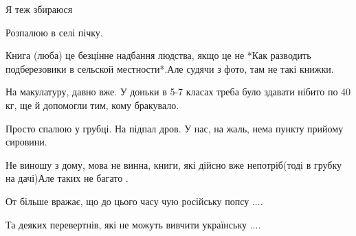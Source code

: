 \begin{itemize}
Я теж збираюся

 
Розпалюю в селі пічку.

 
Книга (люба) це безцінне надбання людства, якщо це не *Как разводить
подберезовики в сельской местности*.Але судячи з фото, там не такі книжки.

 
На макулатуру, давно вже. У доньки в 5-7 класах треба було здавати нібито по 40
кг, ще й допомогли тим, кому бракувало.

 
Просто спалюю у грубці. На підпал дров. У нас, на жаль, нема пункту прийому сировини.

 

Не виношу з дому, мова не винна, книги, які дійсно вже непотріб(тоді в грубку на
дачі)Але таких не багато .

От більше вражає, що до цього часу чую російську попсу ....

Та деяких перевертнів, які не можуть вивчити українську ....

 

\end{itemize}
